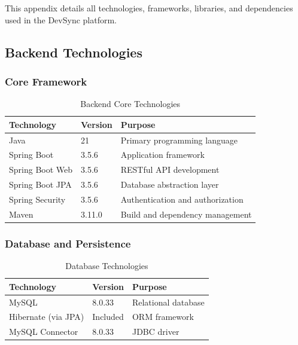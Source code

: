 \documentclass[12pt,a4paper]{article}
\begin{document}
    This appendix details all technologies, frameworks, libraries, and dependencies used in the DevSync platform.

    \subsection{Backend Technologies}

    \subsubsection{Core Framework}

    \begin{table}[H]
        \caption{Backend Core Technologies}
        \begin{tabular}{|l|l|p{6cm}|}
            \hline
            \textbf{Technology} & \textbf{Version} & \textbf{Purpose} \\
            \hline
            Java & 21 & Primary programming language \\
            \hline
            Spring Boot & 3.5.6 & Application framework \\
            \hline
            Spring Boot Web & 3.5.6 & RESTful API development \\
            \hline
            Spring Boot JPA & 3.5.6 & Database abstraction layer \\
            \hline
            Spring Security & 3.5.6 & Authentication and authorization \\
            \hline
            Maven & 3.11.0 & Build and dependency management \\
            \hline
        \end{tabular}
    \end{table}

    \subsubsection{Database and Persistence}

    \begin{table}[H]
        \caption{Database Technologies}
        \begin{tabular}{|l|l|p{6cm}|}
            \hline
            \textbf{Technology} & \textbf{Version} & \textbf{Purpose} \\
            \hline
            MySQL & 8.0.33 & Relational database \\
            \hline
            Hibernate (via JPA) & Included & ORM framework \\
            \hline
            MySQL Connector & 8.0.33 & JDBC driver \\
            \hline
        \end{tabular}
    \end{table}
\end{document}

